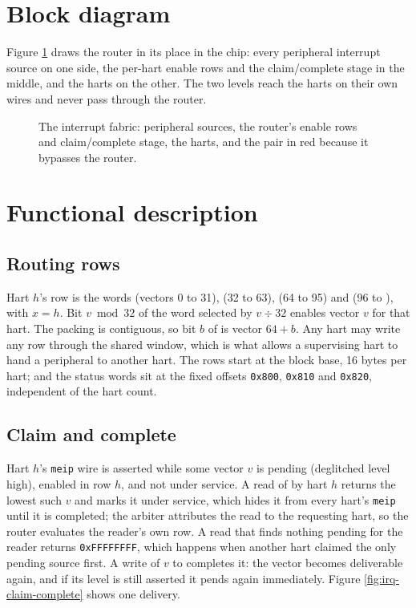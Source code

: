 \section{Block diagram}

Figure \ref{fig:irq-fabric-diagram} draws the router in its place in the chip: every peripheral interrupt source on one side, the per-hart enable rows and the claim/complete stage in the middle, and the harts on the other. The two  levels reach the harts on their own wires and never pass through the router.

\begin{figure}[htpb]
	\centering
	
	\caption{The interrupt fabric: peripheral sources, the router's enable rows and claim/complete stage, the harts, and the  pair in red because it bypasses the router.}
	\label{fig:irq-fabric-diagram}
\end{figure}

\section{Functional description}

\subsection{Routing rows}

Hart $h$'s row is the \IrqEnableWordsWord{} words  (vectors 0 to 31),  (32 to 63),  (64 to 95) and  (96 to \TopVector{}), with $x = h$. Bit $v \bmod 32$ of the word selected by $v \div 32$ enables vector $v$ for that hart. The packing is contiguous, so bit $b$ of  is vector $64 + b$. Any hart may write any row through the shared window, which is what allows a supervising hart to hand a peripheral to another hart. The rows start at the block base, 16 bytes per hart;  and the status words sit at the fixed offsets \texttt{0x800}, \texttt{0x810} and \texttt{0x820}, independent of the hart count.

\subsection{Claim and complete}

Hart $h$'s \texttt{meip} wire is asserted while some vector $v$ is pending (deglitched level high), enabled in row $h$, and not under service. A read of  by hart $h$ returns the lowest such $v$ and marks it under service, which hides it from every hart's \texttt{meip} until it is completed; the arbiter attributes the read to the requesting hart, so the router evaluates the reader's own row. A read that finds nothing pending for the reader returns \texttt{0xFFFFFFFF}, which happens when another hart claimed the only pending source first. A write of $v$ to  completes it: the vector becomes deliverable again, and if its level is still asserted it pends again immediately. Figure \ref{fig:irq-claim-complete} shows one delivery.

